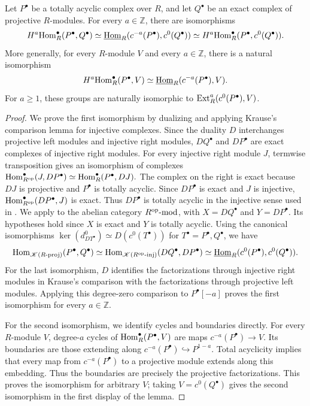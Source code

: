 \documentclass[11pt]{article}
\begin{document}
\begin{Lem}\label{frame:comparison}
Let $P^\bullet$ be a totally acyclic complex over $R$, and let $Q^\bullet$ be an
exact complex of projective $R$-modules. For every $a\in\mathbb Z$, there are isomorphisms
\begin{equation*}
 H^a{\rm Hom}_R^\bullet(P^\bullet,Q^\bullet)
 \simeq\underline{{\rm Hom}}_R(c^{-a}(P^\bullet),c^0(Q^\bullet))
 \simeq H^a{\rm Hom}_R^\bullet(P^\bullet,c^0(Q^\bullet)).
\end{equation*}
More generally, for every $R$-module $V$ and every $a\in\mathbb Z$,
there is a natural isomorphism
\[
 H^a{\rm Hom}_R^\bullet(P^\bullet,V)
 \simeq\underline{{\rm Hom}}_R(c^{-a}(P^\bullet),V).
\]
For $a\ge1$, these groups are naturally isomorphic to
${\rm Ext}_R^a(c^0(P^\bullet),V)$.
\end{Lem}
\begin{proof}
We prove the first isomorphism by dualizing and applying Krause's
comparison lemma for injective complexes. Since the duality $D$
interchanges projective left modules and injective
right modules, $DQ^\bullet$ and $DP^\bullet$ are exact
complexes of injective right modules.
For every injective right module $J$, termwise transposition
gives an isomorphism of complexes
${\rm Hom}_{R^{\rm op}}^\bullet(J,DP^\bullet)\simeq{\rm Hom}_R^\bullet(P^\bullet,DJ).$
The complex on the right is exact because $DJ$ is projective and $P^\bullet$ is totally acyclic.
Since $DP^\bullet$ is exact and $J$ is injective, ${\rm Hom}_{R^{\rm op}}^\bullet(DP^\bullet,J)$ is exact.
Thus $DP^\bullet$ is totally acyclic in the injective sense used in \cite[Section~7]{KrauseSD}.
We apply \cite[Lemma~7.1]{KrauseSD} to the abelian category $R^{\rm op}\mbox{{\rm -mod}}$, with $X=DQ^\bullet$ and $Y=DP^\bullet$. Its hypotheses hold since $X$ is exact
and $Y$ is totally acyclic. Using the canonical isomorphisms $\ker(d_{DT^\bullet}^0)\simeq D(c^0(T^\bullet))$ for $T^\bullet=P^\bullet, Q^\bullet$, we have
\[
 {\rm Hom}_{\mathscr K(R\text{-}\mathrm{proj})}(P^\bullet,Q^\bullet)
 \simeq{\rm Hom}_{\mathscr K(R^{\rm op}\text{-}\mathrm{inj})}(DQ^\bullet,DP^\bullet)
 \simeq\underline{{\rm Hom}}_R(c^0(P^\bullet),c^0(Q^\bullet)).
\]
For the last isomorphism, $D$ identifies the factorizations through
injective right modules in Krause's comparison with the factorizations through projective left modules. Applying this degree-zero comparison to $P^\bullet[-a]$ proves the first
isomorphism for every $a\in\mathbb Z$.

For the second isomorphism, we identify cycles and boundaries directly.
For every $R$-module $V$, degree-$a$ cycles of ${\rm Hom}_R^\bullet(P^\bullet,V)$ are maps
$c^{-a}(P^\bullet)\to V$. Its boundaries are those extending along $c^{-a}(P^\bullet)\hookrightarrow P^{1-a}$. Total acyclicity implies that every map from $c^{-a}(P^\bullet)$ to a projective module extends along this embedding. Thus the boundaries are precisely the projective factorizations.
This proves the isomorphism for arbitrary $V$; taking $V=c^0(Q^\bullet)$
gives the second isomorphism in the first display of the lemma.


\end{proof}
\end{document}
